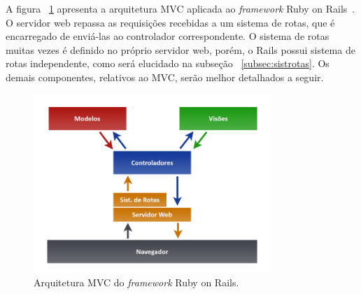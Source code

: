 A figura ~\ref{fig:mvc} apresenta a arquitetura MVC aplicada ao \textit{framework} Ruby on Rails~\cite{basefiguramvc}. O servidor web repassa as requisições recebidas a um sistema de rotas, que é encarregado de enviá-las ao controlador correspondente. O sistema de rotas muitas vezes é definido no próprio servidor web, porém, o Rails possui sistema de rotas independente, como será elucidado na subseção ~\ref{subsec:sistrotas}. Os demais componentes, relativos ao MVC, serão melhor detalhados a seguir.

\begin{figure}[H]
\centering
\includegraphics[width=0.8\textwidth]{figs/mvc}
\caption[\textit{Arquitetura MVC do \textit{framework} Ruby on Rails}.]
{Arquitetura MVC do \textit{framework} Ruby on Rails.}
\label{fig:mvc}
\end{figure}

